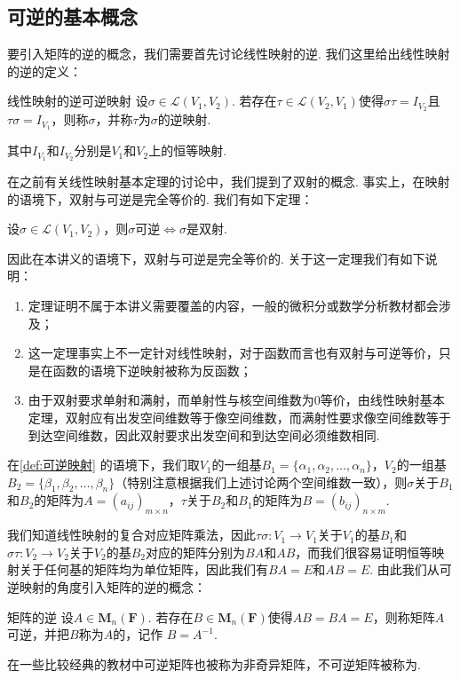 \subsection{可逆的基本概念}

要引入矩阵的逆的概念，我们需要首先讨论线性映射的逆. 我们这里给出线性映射的逆的定义：
\begin{definition}{线性映射的逆}{可逆映射} 
    设$\sigma \in \mathcal{L}(V_1,V_2)$. 若存在$\tau \in \mathcal{L}(V_2,V_1)$使得$\sigma \tau = I_{V_2}$且$\tau \sigma = I_{V_1}$，则称$\sigma$，并称$\tau$为$\sigma$的逆映射.
\end{definition}
其中$I_{V_1}$和$I_{V_2}$分别是$V_1$和$V_2$上的恒等映射.

在之前有关线性映射基本定理的讨论中，我们提到了双射的概念. 事实上，在映射的语境下，双射与可逆是完全等价的. 我们有如下定理：
\begin{theorem}{}{}
    设$\sigma \in \mathcal{L}(V_1,V_2)$，则$\sigma$可逆$\iff \sigma$是双射.
\end{theorem}

因此在本讲义的语境下，双射与可逆是完全等价的. 关于这一定理我们有如下说明：
\begin{enumerate}
    \item 定理证明不属于本讲义需要覆盖的内容，一般的微积分或数学分析教材都会涉及；

    \item 这一定理事实上不一定针对线性映射，对于函数而言也有双射与可逆等价，只是在函数的语境下逆映射被称为反函数；

    \item 由于双射要求单射和满射，而单射性与核空间维数为0等价，由线性映射基本定理，双射应有出发空间维数等于像空间维数，而满射性要求像空间维数等于到达空间维数，因此双射要求出发空间和到达空间必须维数相同.
\end{enumerate}

在\autoref{def:可逆映射} 的语境下，我们取$V_1$的一组基$B_1=\{\alpha_1,\alpha_2,\ldots,\alpha_n\}$，$V_2$的一组基$B_2=\{\beta_1,\beta_2,\ldots,\beta_n\}$（特别注意根据我们上述讨论两个空间维数一致），则$\sigma$关于$B_1$和$B_2$的矩阵为$A=(a_{ij})_{m \times n}$，$\tau$关于$B_2$和$B_1$的矩阵为$B=(b_{ij})_{n \times m}$.

我们知道线性映射的复合对应矩阵乘法，因此$\tau\sigma:V_1\to V_1$关于$V_1$的基$B_1$和$\sigma\tau:V_2\to V_2$关于$V_2$的基$B_2$对应的矩阵分别为$BA$和$AB$，而我们很容易证明恒等映射关于任何基的矩阵均为单位矩阵，因此我们有$BA=E$和$AB=E$. 由此我们从可逆映射的角度引入矩阵的逆的概念：
\begin{definition}{矩阵的逆}{}
    设$A \in \mathbf{M}_n(\mathbf{F})$. 若存在$B \in \mathbf{M}_n(\mathbf{F})$使得$AB=BA=E$，则称矩阵$A$可逆，并把$B$称为$A$的，记作 $ B = A^{-1} $.
\end{definition}
在一些比较经典的教材中可逆矩阵也被称为非奇异矩阵，不可逆矩阵被称为.

